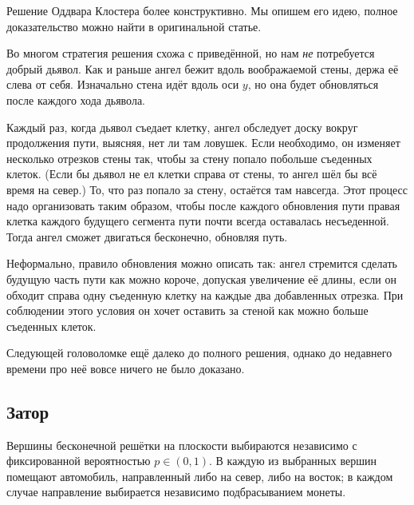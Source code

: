\begin{addedbytheeditors}
Решение Оддвара Клостера \cite{40} более конструктивно.
Мы опишем его идею, полное доказательство можно найти в оригинальной статье.

Во многом стратегия решения схожа с приведённой, но нам \emph{не} потребуется добрый дьявол.
Как и раньше ангел бежит вдоль воображаемой стены, держа её слева от себя.
Изначально стена идёт вдоль оси $y$, но она будет обновляться после каждого хода дьявола.

Каждый раз, когда дьявол съедает клетку, ангел обследует доску вокруг продолжения пути, выясняя, нет ли там ловушек.
Если необходимо, он изменяет несколько отрезков стены так, чтобы за стену попало побольше съеденных клеток.
(Если бы дьявол не ел клетки справа от стены, то ангел шёл бы всё время на север.)
То, что раз попало за стену, остаётся там навсегда.
Этот процесс надо организовать таким образом, чтобы после каждого обновления пути правая клетка каждого будущего сегмента пути почти всегда оставалась несъеденной.
Тогда ангел сможет двигаться бесконечно, обновляя путь.

Неформально, правило обновления можно описать так:
ангел стремится сделать будущую часть пути как можно короче, допуская увеличение её длины, если он обходит справа одну съеденную клетку на каждые два добавленных отрезка.
При соблюдении этого условия он хочет оставить за стеной как можно больше съеденных клеток.
\pr
\end{addedbytheeditors}


\medskip

Следующей головоломке ещё далеко до полного решения,
однако до недавнего времени про неё вовсе ничего не было доказано.

\subsection*{Затор}

Вершины бесконечной решётки на плоскости выбираются независимо с
фиксированной вероятностью $p\in (0,1)$.
В каждую из выбранных вершин
помещают автомобиль, направленный либо на север, либо на восток;
в каждом случае направление выбирается независимо подбрасыванием монеты.

